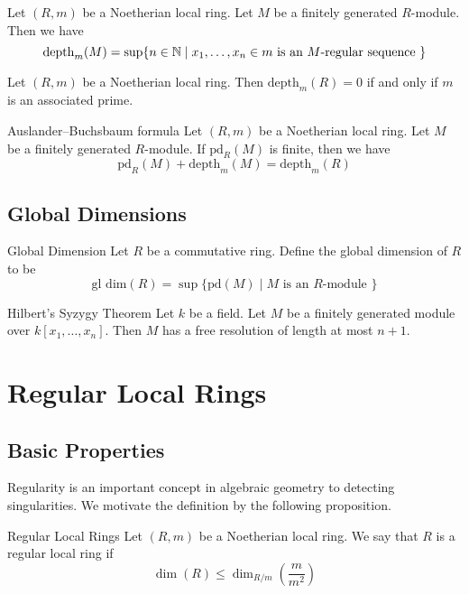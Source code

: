 \documentclass[a4paper]{article}
\begin{document}
\begin{prp}{}{} Let $(R,m)$ be a Noetherian local ring. Let $M$ be a finitely generated $R$-module. Then we have $$\text{depth}_m(M)=\sup\{n\in\mathbb{N}\;|\;x_1,\dots,x_n\in m\text{ is an }M\text{-regular sequence }\}$$
\end{prp}

\begin{prp}{}{} Let $(R,m)$ be a Noetherian local ring. Then $\text{depth}_m(R)=0$ if and only if $m$ is an associated prime. 
\end{prp}

\begin{thm}{Auslander–Buchsbaum formula}{} Let $(R,m)$ be a Noetherian local ring. Let $M$ be a finitely generated $R$-module. If $\text{pd}_R(M)$ is finite, then we have $$\text{pd}_R(M)+\text{depth}_m(M)=\text{depth}_m(R)$$
\end{thm}

\subsection{Global Dimensions}
\begin{defn}{Global Dimension}{} Let $R$ be a commutative ring. Define the global dimension of $R$ to be $$\text{gl dim}(R)=\sup\{\text{pd}(M)\;|\;M\text{ is an }R\text{-module }\}$$
\end{defn}

\begin{thm}{Hilbert's Syzygy Theorem}{} Let $k$ be a field. Let $M$ be a finitely generated module over $k[x_1,\dots,x_n]$. Then $M$ has a free resolution of length at most $n+1$. 
\end{thm}

\pagebreak
\section{Regular Local Rings}
\subsection{Basic Properties}
Regularity is an important concept in algebraic geometry to detecting singularities. We motivate the definition by the following proposition. 

\begin{defn}{Regular Local Rings}{} Let $(R,m)$ be a Noetherian local ring. We say that $R$ is a regular local ring if $$\dim(R)\leq\dim_{R/m}\left(\frac{m}{m^2}\right)$$
\end{defn}
\end{document}
